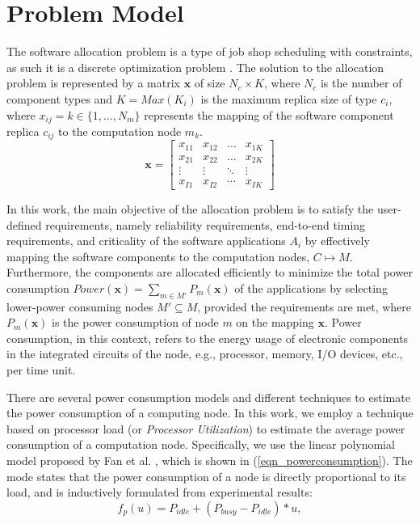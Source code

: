 \section{Problem Model}\label{sec_extrafunc}
The software allocation problem is a type of job shop scheduling with constraints, as such it is a discrete optimization problem \cite{}. The solution to the allocation problem is represented by a matrix $\textbf{x}$ of size $N_c\times K$, where $N_c$ is the number of component types and $K=Max(K_i)$ is the maximum replica size of type $c_i$, where $x_{ij}=k\in \{1,…,N_m\}$ represents the mapping of the software component replica $c_{ij}$ to the computation node $m_k$.
\begin{equation}
\label{fig_pso_solution_representation}
\textbf{x}=
\begin{bmatrix} 
x_{11} & x_{12} & \dots & x_{1K}\\
x_{21} & x_{22} & \dots & x_{2K}\\
\vdots & \vdots & \ddots & \vdots\\
x_{I1} & x_{I2} & \cdots & x_{IK}
\end{bmatrix}
\end{equation}

In this work, the main objective of the allocation problem is to satisfy the user-defined requirements, namely reliability requirements, end-to-end timing requirements, and criticality of the software applications $A_i$ by effectively mapping the software components to the computation nodes, $C\mapsto M$. Furthermore, the components are allocated efficiently to minimize the total power consumption $Power(\textbf{x})=\sum_{m\in M'}{P_{m}(\textbf{x})}$ of the applications by selecting lower-power consuming nodes $M'\subseteq M$, provided the requirements are met, where $P_{m}(\textbf{x})$ is the power consumption of node $m$ on the mapping $\textbf{x}$. Power consumption, in this context, refers to the energy usage of electronic components in the integrated circuits of the node, e.g., processor, memory, I/O devices, etc., per time unit. 

There are several power consumption models and different techniques to estimate the power consumption of a computing node. In this work, we employ a technique based on processor load (or \textit{Processor Utilization}) to estimate the average power consumption of a computation node. Specifically, we use the linear polynomial model proposed by Fan et al. \cite{Fan2007PowerComputer}, which is shown in (\ref{eqn_powerconsumption}). The mode states that the power consumption of a node is directly proportional to its load, and is inductively formulated from experimental results:
\begin{equation}
\label{eqn_powerconsumption}
f_p(u)=P_{idle} + (P_{busy}-P_{idle})*u,
\end{equation}

